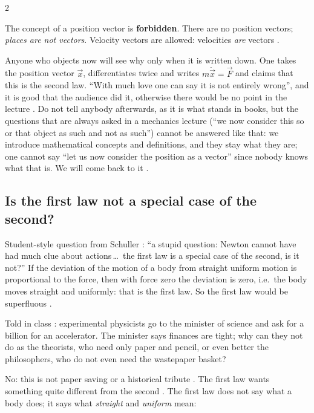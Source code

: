 \begin{paracol}{2}
\begin{theorem}\label{thm:bv-no-position-vector}
The concept of a position vector is \textbf{forbidden}. There are no position vectors; \emph{places are not vectors}.
Velocity vectors are allowed: velocities \emph{are} vectors .
\end{theorem}
Anyone who objects now will see why only when it is written down. One takes the position vector $\vec x$, differentiates
twice and writes $m\ddot{\vec x}=\vec F$ and claims that this is the second law. ``With much love one can say it
is not entirely wrong'', and it is good that the audience did it, otherwise there would be no point in the lecture
. Do not tell anybody afterwards, as it is what stands in books, but
the questions that are always asked in a mechanics lecture (``we now consider this so or that object as such and not
as such'') cannot be answered like that: we introduce mathematical concepts and definitions, and they stay what they
are; one cannot say ``let us now consider the position as a vector'' since nobody knows what that is. We will
come back to it .

\subsection{Is the first law not a special case of the second?}\label{ssec:bv-first-second}

Student-style question from Schuller : ``a stupid question: Newton cannot have had much clue about
actions\,\ldots\ the first law is a special case of the second, is it not?'' If the deviation of the motion of a
body from straight uniform motion is proportional to the force, then with force zero the deviation is zero, i.e.\ the
body moves straight and uniformly: that is the first law. So the first law would be superfluous .

\begin{aside}
Told in class : experimental physicists go to the minister of science and ask for a billion for an
accelerator. The minister says finances are tight; why can they not do as the theorists, who need only paper and
pencil, or even better the philosophers, who do not even need the wastepaper basket?
\end{aside}
No: this is not paper saving or a historical tribute . The first law wants something
quite different from the second . The first law does not say what a body does; it says what
\emph{straight} and \emph{uniform} mean:


\end{paracol}
